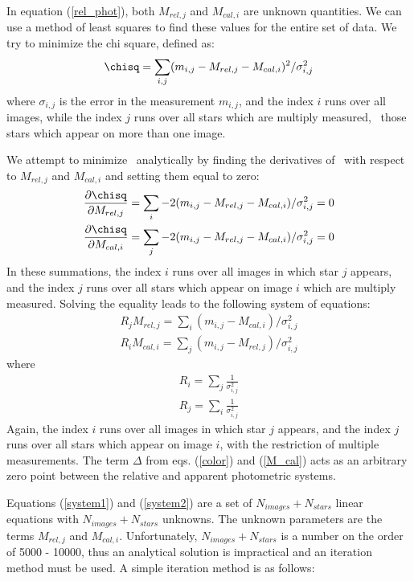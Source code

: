 \documentclass{article}
\begin{document}
        In equation (\ref{rel_phot}), both $M_{rel,j}$ and $M_{cal,i}$
are unknown quantities.  We can use a method of least squares to find
these values for the entire set of data.  We try to minimize the chi
square, defined as:
\begin{equation}
\chisq = \sum_{i,j}(m_{i,j} - M_{rel,j} - M_{cal,i})^2 / \sigma_{i,j}^2 \label{chisquare}
\end{equation}
where $\sigma_{i,j}$ is the error in the measurement $m_{i,j}$, and
the index $i$ runs over all images, while the index $j$ runs over all
stars which are multiply measured, \ie\ those stars which appear on more
than one image.

        We attempt to minimize \chisq\ analytically by finding the
derivatives of \chisq\ with respect to $M_{rel,j}$ and $M_{cal,i}$
and setting them equal to zero:
\begin{eqnarray}
\frac{\partial\chisq}{\partial M_{rel,j}} = \sum_{i}-2(m_{i,j} -
M_{rel,j} - M_{cal,i}) / \sigma_{i,j}^2 = 0  \nonumber \\
\frac{\partial\chisq}{\partial M_{cal,i}} = \sum_{j}-2(m_{i,j} -
M_{rel,j} - M_{cal,i}) / \sigma_{i,j}^2 = 0
\end{eqnarray}
In these summations, the index $i$ runs over all images in which star
$j$ appears, and the index $j$ runs over all stars which appear on
image $i$ which are multiply measured.  Solving the equality leads to
the following system of equations:
\begin{eqnarray}
R_{j}M_{rel,j} = \sum_{i}(m_{i,j} - M_{cal,i}) / \sigma_{i,j}^2 \label{system1} \\
R_{i}M_{cal,i} = \sum_{j}(m_{i,j} - M_{rel,j}) / \sigma_{i,j}^2 \label{system2}
\end{eqnarray}
where 
\begin{eqnarray}
R_{i} = \sum_{j}\frac{1}{\sigma_{i,j}^2} \nonumber \\
R_{j} = \sum_{i}\frac{1}{\sigma_{i,j}^2} 
\end{eqnarray}
Again, the index $i$ runs over all images in which star $j$ appears,
and the index $j$ runs over all stars which appear on image $i$, with
the restriction of multiple measurements.  The term $\Delta$ from
eqs. (\ref{color}) and (\ref{M_cal}) acts as an arbitrary zero point
between the relative and apparent photometric systems.

        Equations (\ref{system1}) and (\ref{system2}) are a set of
$N_{images} + N_{stars}$ linear equations with $N_{images} +
N_{stars}$ unknowns.  The unknown parameters are the terms $M_{rel,j}$
and $M_{cal,i}$.  Unfortunately, $N_{images} + N_{stars}$ is a number
on the order of 5000 - 10000, thus an analytical solution is
impractical and an iteration method must be used.  A simple iteration
method is as follows:
\end{document}
